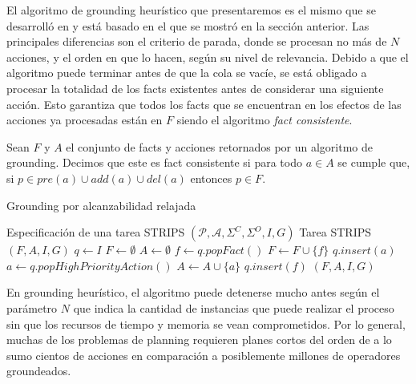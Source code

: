 El algoritmo de grounding heurístico que presentaremos es el mismo que se
desarrolló en \citep{Gnad_Torralba_Dominguez_Areces_Bustos_2019} y está basado
en el que se mostró en la sección anterior. Las principales diferencias son el
criterio de parada, donde se procesan no más de $N$ acciones, y el orden en que
lo hacen, según su nivel de relevancia. Debido a que el algoritmo puede
terminar antes de que la cola se vacíe, se está obligado a procesar la totalidad
de los facts existentes antes de considerar una siguiente acción. Esto garantiza
que todos los facts que se encuentran en los efectos de las acciones ya
procesadas están en $F$ siendo el algoritmo \emph{fact consistente}.

\begin{mydef}
    Sean $F$ y $A$ el conjunto de facts y acciones retornados por un algoritmo
    de grounding. Decimos que este es fact consistente si para todo $a \in A$ se
    cumple que, si $p \in pre(a) \cup add(a) \cup del(a)$ entonces $p \in F$.
\end{mydef}

\begin{algorithm}
    \caption{Grounding por alcanzabilidad relajada}\label{alg:cap}
    \begin{algorithmic}
    \Require Especificación de una tarea STRIPS $(\mathcal{P}, \mathcal{A},
    \Sigma^{C}, \Sigma^{O}, I, G)$
    \Ensure Tarea STRIPS $(F, A, I, G)$ 
    \State $q \gets I$
    \State $F \gets \emptyset$
    \State $A \gets \emptyset$
        \State $f \gets q.popFact()$
        \State $F \gets F \cup \{f\}$
            \State $q.insert(a)$
        \EndFor
    \Else
        \State $a \gets q.popHighPriorityAction()$
        \State $A \gets A \cup \{a\}$
            \State $q.insert(f)$
        \EndFor
    \EndIf
    \EndWhile
    \State \Return $(F, A, I, G)$
    \end{algorithmic}
\end{algorithm}

En grounding heurístico, el algoritmo puede detenerse mucho antes según el
parámetro $N$ que indica la cantidad de instancias que puede realizar el proceso
sin que los recursos de tiempo y memoria se vean comprometidos. Por lo general,
muchas de los problemas de planning requieren planes cortos del orden de a lo
sumo cientos de acciones en comparación a posiblemente millones de operadores
groundeados.

